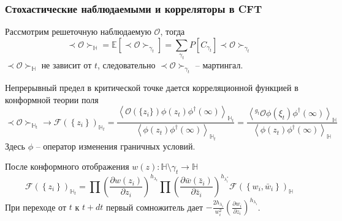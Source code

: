 \documentclass[pdftex]{beamer}
\theoremstyle{definition} \newtheorem{Def}{Определение}
\begin{document}
\begin{frame}
  \frametitle{Стохастические наблюдаемыми и корреляторы в CFT}
      \vspace{-0.2cm}
  Рассмотрим решеточную наблюдаемую $\mathcal{O}$, тогда
  \begin{equation*}
    \prec \mathcal{O} \succ_{\mathbb{H}}=\mathbb{E}\left[\prec\mathcal{O}\succ_{\gamma_{t}}\right]=\sum_{\gamma_{t}} P\left[C_{\gamma_{t}}\right] \prec \mathcal{O} \succ_{\gamma_{t}}
  \end{equation*}
  $\prec \mathcal{O} \succ_{\mathbb{H}}$ не зависит от $t$, следовательно $\prec\mathcal{O}\succ_{\gamma_{t}}$ -- мартингал.

  Непрерывный предел в критической точке дается корреляционной функцией в конформной теории поля
  \begin{equation*}
    \prec \mathcal{O} \succ_{\mathbb{H}_{t}}\to \mathcal{F}(\left\{z_{i}\right\})_{\mathbb{H}_{t}}=
    \frac{\left< \mathcal{O}(\{z_{i}\})\phi(z_{t})\phi^{\dagger}(\infty)\right>_{\mathbb{H}_{t}}}{\left<\phi(z_{t})\phi^{\dagger}(\infty)\right>_{\mathbb{H}_{t}}}=
    \frac{\left< ^{g_{t}}\mathcal{O}\phi(\xi_{t})\phi^{\dagger}(\infty)\right>_{\mathbb{H}}}{\left<\phi(z_{t})\phi^{\dagger}(\infty)\right>_{\mathbb{H}}}
  \end{equation*}
  Здесь $\phi$ -- оператор изменения граничных условий.


  После конформного отображения $w(z):\mathbb{H}\setminus\gamma_{t}\to \mathbb{H}$
  \begin{equation*}
    \mathcal{F}(\left\{z_{i}\right\})_{\mathbb{H}_{t}}=\prod \left(\frac{\partial w(z_{i})}{\partial z_{i}}\right)^{h_{\lambda_i}} 
    \prod \left(\frac{\partial \bar w(\bar z_{i})}{\partial \bar z_{i}}\right)^{h_{\lambda^{*}_i}}
        \mathcal{F}(\left\{w_{i}, \bar w_{i}\right\})_{\mathbb{H}}
  \end{equation*}
  При переходе от  $t$ к $t+dt$ первый сомножитель дает $-\frac{2h_{\lambda_{i}}}{w_{i}^{2}}\left(\frac{\partial w_{i}}{\partial z_{i}}\right)^{h_{\lambda_{i}}}$.
\end{frame}
\end{document}
